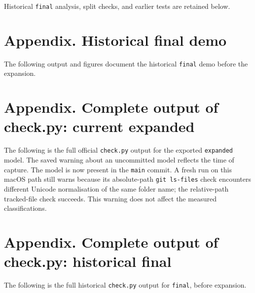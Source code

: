 \documentclass[11pt]{article}
\begin{document}
Historical \texttt{final} analysis, split checks, and earlier tests are retained below.

\section*{Appendix. Historical final demo}
The following output and figures document the historical \texttt{final} demo before the expansion.
\par\noindent {}\par
\par\noindent {}\par
\section*{Appendix. Complete output of check.py: current expanded}
The following is the full official \texttt{check.py} output for the exported \texttt{expanded} model. The saved warning about an uncommitted model reflects the time of capture. The model is now present in the \texttt{main} commit. A fresh run on this macOS path still warns because its absolute-path \texttt{git ls-files} check encounters different Unicode normalisation of the same folder name; the relative-path tracked-file check succeeds. This warning does not affect the measured classifications.

\section*{Appendix. Complete output of check.py: historical final}
The following is the full historical \texttt{check.py} output for \texttt{final}, before expansion.
\end{document}
